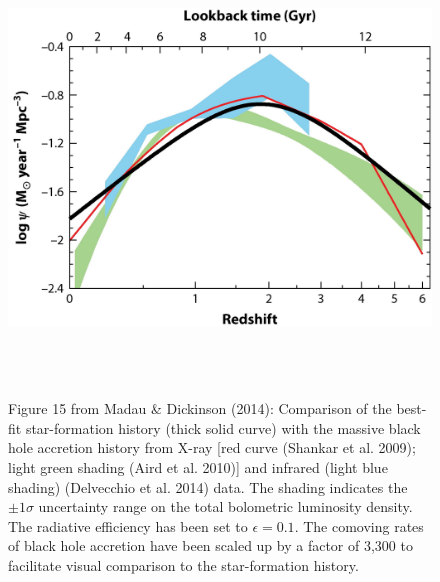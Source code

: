 \hspace{-7.5cm}
\begin{figure}[h]
  \begin{center}
    \hspace{-0.5cm}
    \includegraphics[height=12.0cm,width=16.0cm]{../Figures/MadauDickinson2014_Fig15_hires.jpeg}
    \vspace{-10pt}
\caption{Figure 15 from Madau \& Dickinson (2014):   
 Comparison of the best-fit star-formation history (thick solid curve)
with the massive black hole accretion history from X-ray [red curve
(Shankar et al. 2009); light green shading (Aird et al. 2010)] and
infrared (light blue shading) (Delvecchio et al. 2014) data. The
shading indicates the $\pm1\sigma$ uncertainty range on the total
bolometric luminosity density. The radiative efficiency has been set
to $\epsilon = 0.1$. The comoving rates of black hole accretion have been
scaled up by a factor of 3,300 to facilitate visual comparison to the
star-formation history.}
    \label{figtest-fig}
  \end{center}
\end{figure}

